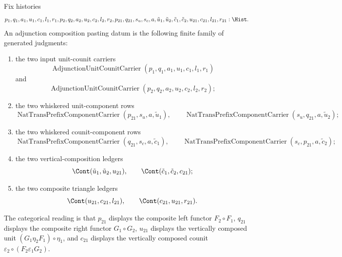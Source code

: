 \begin{definition}
\label{def:adjunction-composition-pasting-data}
Fix histories
$$
p_1,q_1,a_1,u_1,c_1,l_1,r_1,p_2,q_2,a_2,u_2,c_2,l_2,r_2,p_{21},q_{21},s_u,s_c,a,\tilde u_1,\tilde u_2,\tilde c_1,\tilde c_2,u_{21},c_{21},l_{21},r_{21} : \Hist .
$$
An adjunction composition pasting datum is the following finite family of generated judgments:
\begin{enumerate}
\item the two input unit-counit carriers
$$
\operatorname{AdjunctionUnitCounitCarrier}(p_1,q_1,a_1,u_1,c_1,l_1,r_1)
$$
and
$$
\operatorname{AdjunctionUnitCounitCarrier}(p_2,q_2,a_2,u_2,c_2,l_2,r_2);
$$
\item the two whiskered unit-component rows
$$
\operatorname{NatTransPrefixComponentCarrier}(p_{21},s_u,a,\tilde u_1),\qquad
\operatorname{NatTransPrefixComponentCarrier}(s_u,q_{21},a,\tilde u_2);
$$
\item the two whiskered counit-component rows
$$
\operatorname{NatTransPrefixComponentCarrier}(q_{21},s_c,a,\tilde c_1),\qquad
\operatorname{NatTransPrefixComponentCarrier}(s_c,p_{21},a,\tilde c_2);
$$
\item the two vertical-composition ledgers
$$
\Cont(\tilde u_1,\tilde u_2,u_{21}),\qquad\Cont(\tilde c_1,\tilde c_2,c_{21});
$$
\item the two composite triangle ledgers
$$
\Cont(u_{21},c_{21},l_{21}),\qquad\Cont(c_{21},u_{21},r_{21}).
$$
\end{enumerate}
The categorical reading is that $p_{21}$ displays the composite left functor $F_2\circ F_1$, $q_{21}$ displays the composite right functor $G_1\circ G_2$, $u_{21}$ displays the vertically composed unit $(G_1\eta_2F_1)\circ\eta_1$, and $c_{21}$ displays the vertically composed counit $\varepsilon_2\circ(F_2\varepsilon_1G_2)$.
\end{definition}

